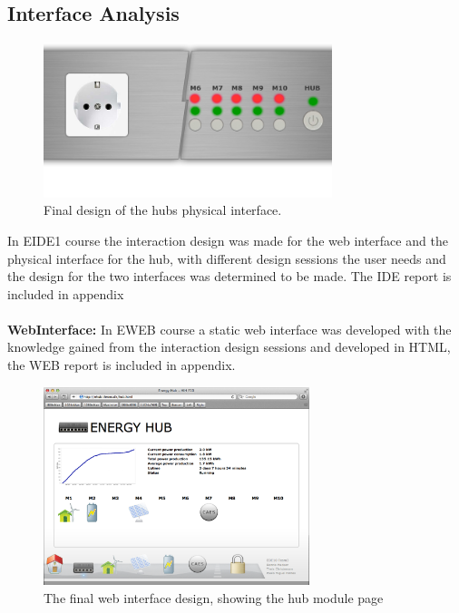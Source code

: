 \subsection{Interface Analysis}
\begin{figure}[H]
	\begin{centering}
		 \includegraphics[width=0.75\textwidth]{images/hub_user_interact.png}
		\caption{Final design of the hubs physical interface.}
	\end{centering}
\end{figure}
In EIDE1 course the interaction design was made for the web interface and the physical interface for the hub, with different design sessions the user needs and the design for the two interfaces was determined to be made. The IDE report is included in appendix\\
\\\textbf{WebInterface:} In EWEB course a static web interface was developed with the knowledge gained from the interaction design sessions and developed in HTML, the WEB report is included in appendix.
\begin{figure}[H]
	\begin{centering}
		 \includegraphics[width=0.69\textwidth]{images/screen_hub_page.png}
		\caption{The final web interface design, showing the hub module page}
 	\end{centering}
\end{figure}
